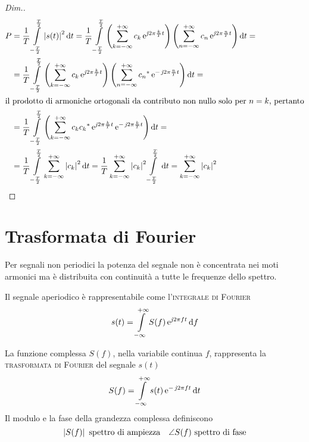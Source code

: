 \begin{proof}[Dim.]
\begin{align*}
	P&=\frac{1}{T}\intd{-\frac{T}{2}}{\frac{T}{2}}{\abs{s(t)}^2}{t}=\frac{1}{T}\intd{-\frac{T}{2}}{\frac{T}{2}}{ \left(\sum_{k=-\infty}^{+\infty}{c_k\e{\imath 2\pi\frac{k}{T}t}}\right) \left(\sum_{n=-\infty}^{+\infty}{c_n\e{\imath 2\pi\frac{n}{T}t}}\right)}{t}=\\
	&=\frac{1}{T}\intd{-\frac{T}{2}}{\frac{T}{2}}{ \left(\sum_{k=-\infty}^{+\infty}{c_k\e{\imath 2\pi\frac{k}{T}t}}\right) \left(\sum_{n=-\infty}^{+\infty}{\conj{c_n}\e{-\imath 2\pi\frac{n}{T}t}}\right)}{t}=\\
\intertext{il prodotto di armoniche ortogonali da contributo non nullo solo per $n=k$, pertanto}
	&=\frac{1}{T}\intd{-\frac{T}{2}}{\frac{T}{2}}{ \left(\sum_{k=-\infty}^{+\infty}{c_k \conj{c_k} \e{\imath 2\pi\frac{k}{T}t} \e{-\imath 2\pi\frac{k}{T}t}}\right)}{t}=\\
	&=\frac{1}{T}\intd{-\frac{T}{2}}{\frac{T}{2}}{\sum_{k=-\infty}^{+\infty}{\abs{c_k}^2}}{t}=
	\frac{1}{T}\sum_{k=-\infty}^{+\infty}{\abs{c_k}^2}\intd{-\frac{T}{2}}{\frac{T}{2}}{}{t}=\sum_{k=-\infty}^{+\infty}{\abs{c_k}^2}
\qedhere
\end{align*}
\end{proof}

\section{Trasformata di Fourier}
Per segnali non periodici la potenza del segnale non è concentrata nei moti armonici ma è distribuita con continuità a tutte le frequenze dello spettro.

Il segnale aperiodico è rappresentabile come l'\textsc{integrale di Fourier}
\begin{equation}
\label{eq:antitrasformata_Fourier}
	s(t)=\int\limits_{-\infty}^{+\infty}{S(f)\operatorname{e}^{\operatorname{\mathit{j}\!} 2\pi f t}}{\,\mathop{}\!\mathrm{d}{f}}
\end{equation}

La funzione complessa $S(f)$, nella variabile continua $f$, rappresenta la \textsc{trasformata di Fourier} del segnale $s(t)$
\begin{equation}
\label{eq:trasformata_Fourier}
	S(f)=\int\limits_{-\infty}^{+\infty}{s(t)\operatorname{e}^{-\operatorname{\mathit{j}\!} 2\pi f t}}{\,\mathop{}\!\mathrm{d}{t}}
\end{equation}
Il modulo e la fase della grandezza complessa definiscono
\[
	\left|{S(f)}\right|\text{ spettro di ampiezza}\quad\angle S(f)\text{ spettro di fase}
\]

